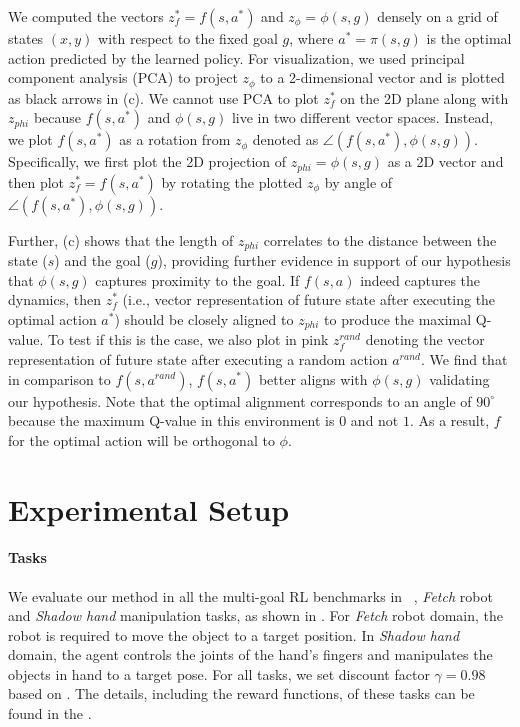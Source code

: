 \documentclass[dvipsnames]{article} %
\theoremstyle{definition}
\theoremstyle{remark}
\newcommand{\fetch}{\textit{Fetch}\xspace}
\newcommand{\hand}{\textit{Shadow hand}\xspace}
\begin{document}
We computed the vectors $z_f^* = f(s,a^*)$ and $z_{\phi} = \phi(s,g)$ densely on a grid of states $(x, y)$ with respect to the fixed goal $g$, where $a^* = \pi(s,g)$ is the optimal action predicted by the learned policy.  For visualization, we used principal component analysis (PCA) to project $z_{\phi}$ to a 2-dimensional vector and is plotted as black arrows in (c). We cannot use PCA to plot $z_f^*$ on the 2D plane along with $z_{phi}$ because $f(s,a^*)$ and $\phi(s,g)$ live in two different vector spaces. Instead, we plot $f(s, a^*)$ as a rotation from $z_{\phi}$ denoted as $\angle (f(s,a^*), \phi(s,g))$. Specifically, we first plot the 2D projection of $z_{phi}= \phi(s,g)$ as a 2D vector and then plot $z_f^* = f(s,a^*)$ by rotating the plotted $z_{\phi}$ by angle of $\angle (f(s,a^*), \phi(s,g))$. 

Further, (c) shows that the length of $z_{phi}$ correlates to the distance between the state ($s$) and the goal ($g$), providing further evidence in support of our hypothesis that $\phi(s,g)$ captures proximity to the goal. If $f(s,a)$ indeed captures the dynamics, then $z_f^{*}$ (i.e., vector representation of future state after executing the optimal action $a^*$) should be closely aligned to $z_{phi}$ to produce the maximal Q-value. To test if this is the case, we also plot in pink $z_f^{rand}$ denoting the vector representation of future state after executing a random action $a^{rand}$. 
We find that in comparison to $f(s, a^{rand})$, $f(s, a^*)$ better aligns with $\phi(s, g)$ validating our hypothesis. Note that the optimal alignment corresponds to an angle of $90^{\circ}$ because the maximum Q-value in this environment is 0 and not $1$. As a result, $f$ for the optimal action will be orthogonal to  $\phi$.


\section{Experimental Setup} 
\label{sec:setup}

\paragraph{Tasks} We evaluate our method in all the multi-goal RL benchmarks in ~\cite{plappert2018multi}, \fetch robot and \hand manipulation tasks, as shown in .
For \fetch robot domain, the robot is required to move the object to a target position. In \hand domain, the agent controls the joints of the hand's fingers and manipulates the objects in hand to a target pose. For all tasks, we set discount factor $\gamma = 0.98$ based on \citet{plappert2018multi}. The details, including the reward functions, of these tasks can be found in the .
\end{document}
